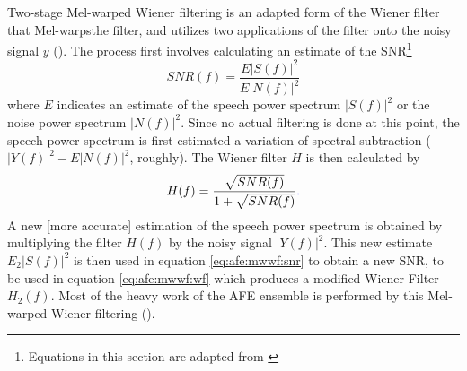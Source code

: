 Two-stage Mel-warped Wiener filtering is an adapted form of the Wiener filter that \DIFdelbegin {}\DIFdelend \DIFaddbegin {}\DIFaddend Mel-warps\DIFaddbegin {}\DIFaddend the filter, and utilizes two applications of the filter onto the noisy signal $y$ (\cite{etsi:02}).  The process first involves calculating an estimate of the SNR\footnote{Equations in this section are adapted from \cite{etsi:02}} \begin{equation}\label{eq:afe:mwwf:snr} SNR(f) = \dfrac{E|S(f)|^2}{E|N(f)|^2} \end{equation} where $E$ indicates an estimate of the speech power spectrum $|S(f)|^2$ or the noise power spectrum $|N(f)|^2$.  Since no actual filtering is done at this point, the speech power spectrum is first estimated \DIFdelbegin \DIFdel{, }\DIFdelend \DIFaddbegin {}\DIFaddend a variation of spectral subtraction (\DIFdelbegin {}\DIFdelend $|Y(f)|^2 - E|N(f)|^2$, roughly).  The Wiener filter $H$ is then calculated by \begin{equation}\label{eq:afe:mwwf:wf} H(f) = \DIFdelbegin %
\DIFdelend \DIFaddbegin \dfrac{\sqrt{SNR(f)}}{1+\sqrt{SNR(f)}}\DIFadd{. }\DIFaddend \end{equation}  A new [more accurate] estimation of the speech power spectrum is obtained by multiplying the filter $H(f)$ by the noisy signal $|Y(f)|^2$.  This new estimate $E_2|S(f)|^2$ is then used in equation \ref{eq:afe:mwwf:snr} to obtain a new SNR, to be used in equation \ref{eq:afe:mwwf:wf} which produces a modified Wiener Filter $H_2(f)$.  Most of the heavy work of the AFE ensemble is performed by this Mel-warped Wiener filtering (\cite{li:14}).

